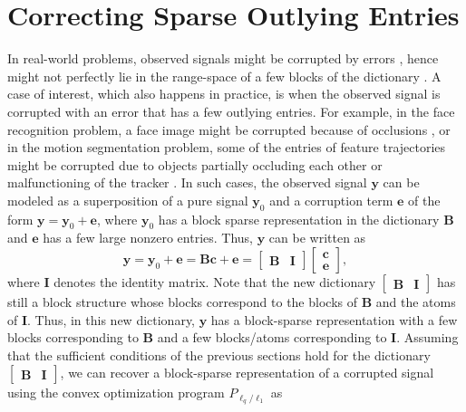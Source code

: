 \documentclass[10pt,twocolumn,twoside] {IEEEtran}
\begin{document}
{\section{Correcting Sparse Outlying Entries}
\label{sec:discussion}
In real-world problems, observed signals might be corrupted by errors \cite{Wright:PAMI09, Wright:TIT10}, hence might not perfectly lie in the range-space of a few blocks of the dictionary \cite{Elhamifar:CVPR11}. A case of interest, which also happens in practice, is when the observed signal is corrupted with an error that has a few outlying entries. For example, in the face recognition problem, a face image might be corrupted because of occlusions \cite{Wright:PAMI09}, or in the motion segmentation problem, some of the entries of feature trajectories might be corrupted due to objects partially occluding each other or malfunctioning of the tracker \cite{Rao:CVPR08, Elhamifar:CVPR09}. In such cases, the observed signal ${\boldsymbol{y}}$ can be modeled as a superposition of a pure signal ${\boldsymbol{y}}_0$ and a corruption term ${\boldsymbol{e}}$ of the form ${\boldsymbol{y}} = {\boldsymbol{y}}_0 + {\boldsymbol{e}}$, where ${\boldsymbol{y}}_0$ has a block sparse representation in the dictionary ${\boldsymbol{B}}$ and ${\boldsymbol{e}}$ has a few large nonzero entries. 
Thus, ${\boldsymbol{y}}$ can be written as 
\begin{equation}
\label{eq:corrupted}
{\boldsymbol{y}} = {\boldsymbol{y}}_0 + {\boldsymbol{e}} = {\boldsymbol{B}} {\boldsymbol{c}} + {\boldsymbol{e}} = \begin{bmatrix} {\boldsymbol{B}} & {\boldsymbol{I}} \end{bmatrix} \begin{bmatrix} {\boldsymbol{c}} \\ {\boldsymbol{e}} \end{bmatrix},
\end{equation}
where ${\boldsymbol{I}}$ denotes the identity matrix. Note that the new dictionary $\begin{bmatrix} {\boldsymbol{B}} & {\boldsymbol{I}} \end{bmatrix}$ has still a block structure whose blocks correspond to the blocks of ${\boldsymbol{B}}$ and the atoms of ${\boldsymbol{I}}$. Thus, in this new dictionary, ${\boldsymbol{y}}$ has a block-sparse representation with a few blocks corresponding to ${\boldsymbol{B}}$ and a few blocks/atoms corresponding to ${\boldsymbol{I}}$. Assuming that the sufficient conditions of the previous sections hold for the dictionary $\begin{bmatrix} {\boldsymbol{B}} & {\boldsymbol{I}} \end{bmatrix}$, we can recover a block-sparse representation of a corrupted signal using the convex optimization program $P_{\ell_q/\ell_1}$ as
}
\end{document}
